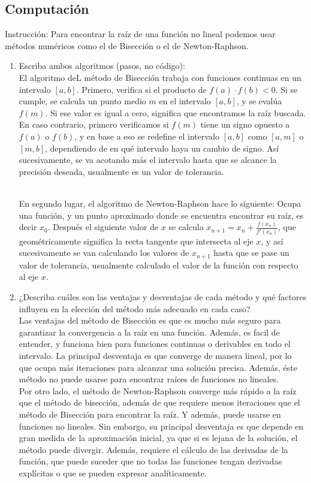 \documentclass[12pt, letterpaper]{report}
\begin{document}
\subsection*{Computación}
Instrucción: Para encontrar la raíz de una función no lineal podemos usar métodos numéricos como el
de Bisección o el de Newton-Raphson.\\ 
\begin{enumerate}
\item Escriba ambos algoritmos (pasos, no código): \\ 
El algoritmo deL método de Bisección trabaja con funciones continuas en un intervalo $[a, b]$. Primero, verifica si el producto de $f(a)\cdot f(b) < 0$. Si se cumple, 
se calcula un punto medio $m$ en el intervalo $[a, b]$, y se evalúa $f(m)$. Si ese valor es igual a cero, significa que encontramos la raíz buscada. En caso contrario, 
primero verificamos si $f(m)$ tiene un signo opuesto a $f(a)$ o $f(b)$, y en base a eso se redefine el intervalo $[a, b]$ como $[a, m]$ o $[m, b]$, dependiendo de en qué intervalo 
haya un cambio de signo. Así sucesivamente, se va acotando más el intervalo hasta que se alcance la precisión deseada, usualmente 
es un valor de tolerancia. \\ 

En segundo lugar, el algoritmo de Newton-Raphson hace lo siguiente: Ocupa una función, y un punto aproximado donde se encuentra
encontrar su raíz, es decir $x_0$. Después el siguiente valor de $x$ se calcula $x_{n+1} = x_n + \frac{f(x_n)}{f'(x_n)}$, que geométricamente significa 
la recta tangente que intersecta al eje $x$, y así sucesivamente se van calculando los valores de $x_{n+1}$ hasta que se pase un valor de tolerancia, usualmente 
calculado el valor de la función con respecto al eje $x$. 
\item ¿Describa cuáles son las ventajas y desventajas de cada método y qué factores influyen
en la elección del método más adecuado en cada caso?\\ 
Las ventajas del método de Bisección es que es mucho más seguro para garantizar la convergencia a la raíz en una función. Además, es facil de entender, y funciona bien 
para funciones continuas o derivables en todo el intervalo. La principal desventaja es que converge de manera lineal, por lo que 
ocupa más iteraciones para alcanzar una solución precisa. Además, éste método no puede usarse para encontrar raíces de funciones 
no lineales. \\ 
Por otro lado, el método de Newton-Raphson converge más rápido a la raíz que el método de bisección, además de que requiere 
menos iteraciones que el método de Bisección para encontrar la raíz. Y además, puede usarse en funciones no lineales. Sin embargo, su principal desventaja es que 
depende en gran medida de la aproximación inicial, ya que si es lejana de la solución, el método puede divergir. Además, 
requiere el cálculo de las derivadas de la función, que puede suceder que no todas las funciones tengan derivadas explícitas o que se pueden 
expresar analíticamente. \\ 


\end{enumerate}
\end{document}
